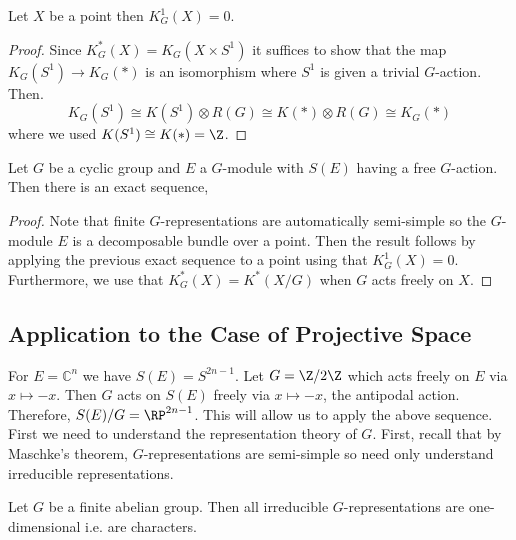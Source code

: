 \documentclass[12pt]{extarticle}
\newcommand{\C}{\mathbb{C}}
\begin{document}
\begin{lemma}
Let $X$ be a point then $K^1_G(X) = 0$. 
\end{lemma}

\begin{proof}
Since $K_G^*(X) = K_G(X \times S^1)$ it suffices to show that the map $K_G(S^1) \to K_G(*)$ is an isomorphism where $S^1$ is given a trivial $G$-action. Then.
\[ K_G(S^1) \cong K(S^1) \otimes R(G) \cong K(*) \otimes R(G) \cong K_G(*) \]
where we used $K(S^1) \cong K(*) = \Z$. 
\end{proof}

\begin{cor}
Let $G$ be a cyclic group and $E$ a $G$-module with $S(E)$ having a free $G$-action. Then there is an exact sequence,
\begin{center}
\end{center}
\end{cor}

\begin{proof}
Note that finite $G$-representations are automatically semi-simple so the $G$-module $E$ is a decomposable bundle over a point. Then the result follows by applying the previous exact sequence to a point using that $K^1_G(X) = 0$. Furthermore, we use that $K^*_G(X) = K^*(X/G)$ when $G$ acts freely on $X$.
\end{proof}

\subsection{Application to the Case of Projective Space}

\begin{rmk}
For $E = \C^n$ we have $S(E) = S^{2n - 1}$. Let $G = \Z/2\Z$ which acts freely on $E$ via $x \mapsto -x$. Then $G$ acts on $S(E)$ freely via $x \mapsto -x$, the antipodal action. Therefore, $S(E)/G = \RP^{2n - 1}$. This will allow us to apply the above sequence. First we need to understand the representation theory of $G$. First, recall that by Maschke's theorem, $G$-representations are semi-simple so need only understand irreducible representations. 
\end{rmk}

\begin{theorem}
Let $G$ be a finite abelian group. Then all irreducible $G$-representations are one-dimensional i.e. are characters. 
\end{theorem}
\end{document}
